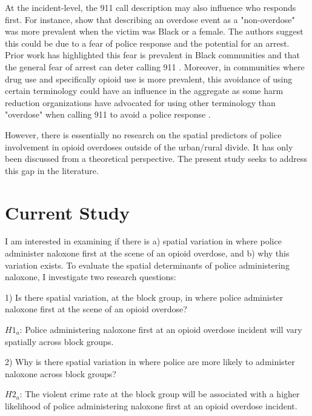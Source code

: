 At the incident-level, the 911 call description may also influence who responds first. For instance, \textcite{atkins_disparities_2024} show that describing an overdose event as a "non-overdose" was more prevalent when the victim was Black or a female. The authors suggest this could be due to a fear of police response and the potential for an arrest. Prior work has highlighted this fear is prevalent in Black communities \parencite{wagner_post-overdose_2019} and that the general fear of arrest can deter calling 911 \parencite{van_der_meulen_thats_2021}. Moreover, in communities where drug use and specifically opioid use is more prevalent, this avoidance of using certain terminology could have an influence in the aggregate as some harm reduction organizations have advocated for using other terminology than "overdose" when calling 911 to avoid a police response \parencite{zagorski_how_2021}.

However, there is essentially no research on the spatial predictors of police involvement in opioid overdoses outside of the urban/rural divide. It has only been discussed from a theoretical perspective. The present study seeks to address this gap in the literature. 

\section{Current Study}

I am interested in examining if there is a) spatial variation in where police administer naloxone first at the scene of an opioid overdose, and b) why this variation exists. To evaluate the spatial determinants of police administering naloxone, I investigate two research questions:

1) Is there spatial variation, at the block group, in where police administer naloxone first at the scene of an opioid overdose? 

\begin{flushleft}
\(H1_a\): Police administering naloxone first at an opioid overdose incident will vary spatially across block groups. 
\end{flushleft}

2) Why is there spatial variation in where police are more likely to administer naloxone across block groups? 

\begin{flushleft}
\(H2_a\): The violent crime rate at the block group will be associated with a higher likelihood of police administering naloxone first at an opioid overdose incident.
\end{flushleft}

